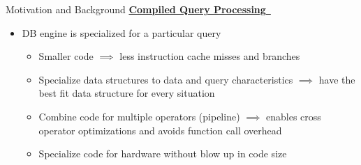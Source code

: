 \begin{block}{Motivation and Background}
    \underline{\textbf{Compiled Query Processing}~\cite{SK16,N11}}
    \begin{itemize}
    \item DB engine is specialized for a particular query
      \begin{itemize}
      \item Smaller code $\implies$ less instruction cache misses and branches
      \item Specialize data structures to data and query characteristics $\implies$ have the best fit data structure for every situation
      \item Combine code for multiple operators (pipeline) $\implies$ enables cross operator optimizations and avoids function call overhead
      \item Specialize code for hardware without blow up in code size
      \end{itemize}
    \end{itemize}
\end{block}


